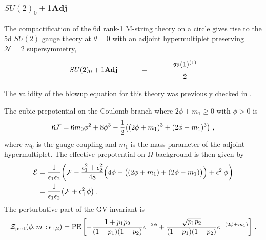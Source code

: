 \subsubsection{\texorpdfstring{$SU(2)_0+1\mathbf{Adj}$}{SU(2)0 + 1Adj}}

The compactification of the 6d rank-1 M-string theory on a circle gives rise to the 5d $SU(2)$ gauge theory at $\theta=0$ with an adjoint hypermultiplet preserving $\mathcal{N}=2$ supersymmetry,
\begin{align}
\begin{tikzpicture}
\draw (0, 0) node {$ SU(2)_0 + 1\mathbf{Adj} $}
(2.5, 0) node {$ = $}
(4.5, 0.3) node {$ \mathfrak{su}(1)^{(1)} $}
(4.5, -0.3) node {$ 2 $};
\end{tikzpicture}
\end{align}
The validity of the blowup equation for this theory was previously checked in \cite{Gu:2019pqj}.

The cubic prepotential on the Coulomb branch where $2\phi\pm m_1\ge0$ with $\phi>0$ is
\begin{align}
6\mathcal{F} = 6m_0 \phi^2+ 8\phi^3 - \frac{1}{2} \qty((2\phi + m_1)^3 + (2\phi - m_1)^3)  \ ,
\end{align}
where $m_0$ is the gauge coupling and $ m_1 $ is the mass parameter of the adjoint hypermultiplet.
The effective prepotential on $\Omega$-background is then given by
\begin{align}\label{eq:eff-pre-su2-adj}
\mathcal{E} &= \frac{1}{\epsilon_1 \epsilon_2} \qty(\mathcal{F} - \frac{\epsilon_1^2 + \epsilon_2^2}{48} \Big(4\phi - \big((2\phi + m_1) + (2\phi - m_1)\big)\Big) + \epsilon_+^2 \phi ) \nonumber \\
&=\frac{1}{\epsilon_1 \epsilon_2} \qty(\mathcal{F} +\epsilon_+^2\phi) \, .
\end{align}
The perturbative part of the GV-invariant is
\begin{align}\label{eq:pert-su2-adj}
	\mathcal{Z}_{\rm pert}(\phi,m_1;\epsilon_{1,2}) = {\rm PE}\left[-\frac{1+p_1p_2}{(1-p_1)(1-p_2)}e^{-2\phi}  + \frac{\sqrt{p_1p_2}}{(1-p_1)(1-p_2)}e^{-(2\phi\pm m_1)}\right] \, .
\end{align}

